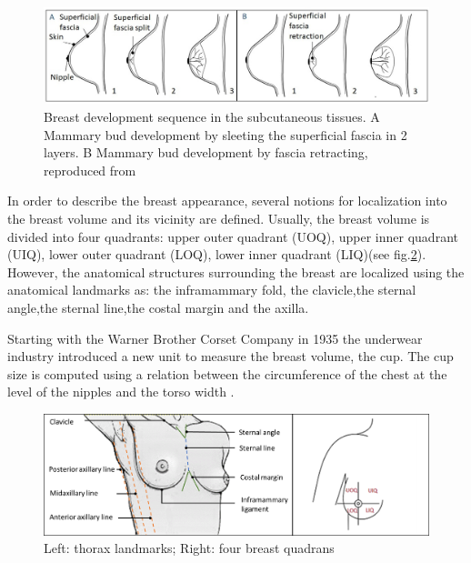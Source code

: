 \begin{figure}[!h]
\centering
\includegraphics[width=0.9\linewidth,keepaspectratio]{figures/breastEvol_fascia_my.jpg} 
\caption[Breast development sequence into subcutaneous tissues. A Mammary bud development by splitting the superficial fascia in 2 layers. B Mammary bud development by superficial fascia retracting]{Breast development sequence in the subcutaneous tissues. A Mammary bud development by sleeting the superficial fascia in 2 layers. B Mammary bud development by fascia retracting, reproduced from  \citep{kopans2007breast}  }
\label{breastevol_fascia}
\end{figure}


\label{subsection:breastappearance}

In order to describe the breast appearance, several notions for localization into the breast volume and its vicinity are defined. Usually, the breast volume is divided into four quadrants: upper outer quadrant (UOQ), upper inner quadrant (UIQ), lower outer quadrant (LOQ), lower inner quadrant (LIQ)(see fig.\ref{fig:Breast_quadrants_full}). However, the anatomical structures surrounding the breast are localized using the anatomical landmarks as:  the inframammary fold, the clavicle,the sternal angle,the sternal line,the costal margin and the axilla.

Starting with the Warner Brother Corset Company in 1935 the underwear industry introduced a new unit to measure the breast volume, the cup. The cup size is computed using a relation between the circumference of the chest at the level of the nipples and the torso width \citep{pechter_new_1998}.

\begin{figure}[h]
\centering
 \includegraphics[width=\textwidth,keepaspectratio]{figures/Breast_quadrants_full.png}
  \caption{Left: thorax landmarks; Right: four breast quadrans}\label{fig:Breast_quadrants_full}
\end{figure}


